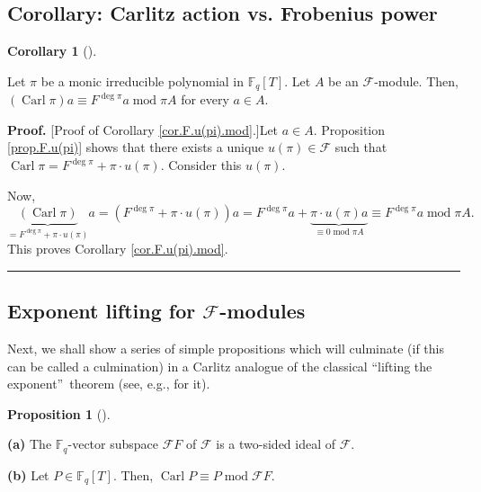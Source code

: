 \documentclass[numbers=enddot,12pt,final,onecolumn,notitlepage]{scrartcl}%
\theoremstyle{definition}
\newtheorem{prop}[theo]{Proposition}
\newenvironment{proposition}[1][]
{\begin{prop}[#1]\begin{leftbar}}
{\end{leftbar}\end{prop}}
\newtheorem{coro}[theo]{Corollary}
\newenvironment{corollary}[1][]
{\begin{coro}[#1]\begin{leftbar}}
{\end{leftbar}\end{coro}}
\newenvironment{proof}[1][Proof]{\noindent\textbf{#1.} }{\ \rule{0.5em}{0.5em}}
\begin{document}
\subsection{Corollary: Carlitz action vs. Frobenius power}

\begin{corollary}
\label{cor.F.u(pi).mod}Let $\pi$ be a monic irreducible polynomial in
$\mathbb{F}_{q}\left[  T\right]  $. Let $A$ be an $\mathcal{F}$-module. Then,
$\left(  \operatorname*{Carl}\pi\right)  a\equiv F^{\deg\pi}%
a\operatorname{mod}\pi A$ for every $a\in A$.
\end{corollary}

\begin{proof}
[Proof of Corollary \ref{cor.F.u(pi).mod}.]Let $a\in A$. Proposition
\ref{prop.F.u(pi)} shows that there exists a unique $u\left(  \pi\right)
\in\mathcal{F}$ such that $\operatorname*{Carl}\pi=F^{\deg\pi}+\pi\cdot
u\left(  \pi\right)  $. Consider this $u\left(  \pi\right)  $.

Now,%
\[
\underbrace{\left(  \operatorname*{Carl}\pi\right)  }_{=F^{\deg\pi}+\pi\cdot
u\left(  \pi\right)  }a=\left(  F^{\deg\pi}+\pi\cdot u\left(  \pi\right)
\right)  a=F^{\deg\pi}a+\underbrace{\pi\cdot u\left(  \pi\right)  a}%
_{\equiv0\operatorname{mod}\pi A}\equiv F^{\deg\pi}a\operatorname{mod}\pi A.
\]
This proves Corollary \ref{cor.F.u(pi).mod}.
\end{proof}

\subsection{Exponent lifting for $\mathcal{F}$-modules}

Next, we shall show a series of simple propositions which will culminate (if
this can be called a culmination) in a Carlitz analogue of the classical
\textquotedblleft lifting the exponent\textquotedblright\ theorem (see, e.g.,
\cite[version with solutions (ancillary file), (12.349)]{reiner-hopf} for it).

\begin{proposition}
\label{prop.F.lift.CarlP-P}\textbf{(a)} The $\mathbb{F}_{q}$-vector subspace
$\mathcal{F}F$ of $\mathcal{F}$ is a two-sided ideal of $\mathcal{F}$.

\textbf{(b)} Let $P\in\mathbb{F}_{q}\left[  T\right]  $. Then,
$\operatorname*{Carl}P\equiv P\operatorname{mod}\mathcal{F}F$.
\end{proposition}
\end{document}
